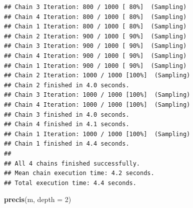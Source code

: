 \documentclass[
]{article}
\newenvironment{Shaded}{\begin{snugshade}}{\end{snugshade}}
\newcommand{\AttributeTok}[1]{\textcolor[rgb]{0.13,0.29,0.53}{#1}}
\newcommand{\DecValTok}[1]{\textcolor[rgb]{0.00,0.00,0.81}{#1}}
\newcommand{\FunctionTok}[1]{\textcolor[rgb]{0.13,0.29,0.53}{\textbf{#1}}}
\newcommand{\NormalTok}[1]{#1}
\begin{document}
\begin{verbatim}
## Chain 3 Iteration: 800 / 1000 [ 80%]  (Sampling) 
## Chain 4 Iteration: 800 / 1000 [ 80%]  (Sampling) 
## Chain 1 Iteration: 800 / 1000 [ 80%]  (Sampling) 
## Chain 2 Iteration: 900 / 1000 [ 90%]  (Sampling) 
## Chain 3 Iteration: 900 / 1000 [ 90%]  (Sampling) 
## Chain 4 Iteration: 900 / 1000 [ 90%]  (Sampling) 
## Chain 1 Iteration: 900 / 1000 [ 90%]  (Sampling) 
## Chain 2 Iteration: 1000 / 1000 [100%]  (Sampling) 
## Chain 2 finished in 4.0 seconds.
## Chain 3 Iteration: 1000 / 1000 [100%]  (Sampling) 
## Chain 4 Iteration: 1000 / 1000 [100%]  (Sampling) 
## Chain 3 finished in 4.0 seconds.
## Chain 4 finished in 4.1 seconds.
## Chain 1 Iteration: 1000 / 1000 [100%]  (Sampling) 
## Chain 1 finished in 4.4 seconds.
## 
## All 4 chains finished successfully.
## Mean chain execution time: 4.2 seconds.
## Total execution time: 4.4 seconds.
\end{verbatim}

\begin{Shaded}
\begin{Highlighting}[]
\FunctionTok{precis}\NormalTok{(m, }\AttributeTok{depth =} \DecValTok{2}\NormalTok{)}
\end{Highlighting}
\end{Shaded}
\end{document}

